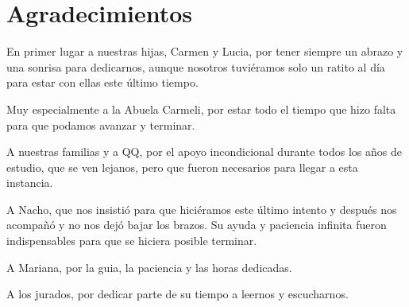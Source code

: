 \chapter*{Agradecimientos}
En primer lugar a nuestras hijas, Carmen y Lucia, por tener siempre un abrazo y una sonrisa para dedicarnos, aunque nosotros tuviéramos solo un ratito al día para estar con ellas este último tiempo.
\bigskip

\noindent
Muy especialmente a la Abuela Carmeli, por estar todo el tiempo que hizo falta para que podamos avanzar y terminar.
\bigskip

\noindent
A nuestras familias y a QQ, por el apoyo incondicional durante todos los años de estudio, que se ven lejanos, pero que fueron necesarios para llegar a esta instancia.
\bigskip

\noindent
A Nacho, que nos insistió para que hiciéramos este último intento y después nos acompañó y no nos dejó bajar los brazos. Su ayuda y paciencia infinita fueron indispensables para que se hiciera posible terminar.
\bigskip

\noindent
A Mariana, por la guia, la paciencia y las horas dedicadas. 
\bigskip

\noindent
A los jurados, por dedicar parte de su tiempo a leernos y escucharnos.
\bigskip